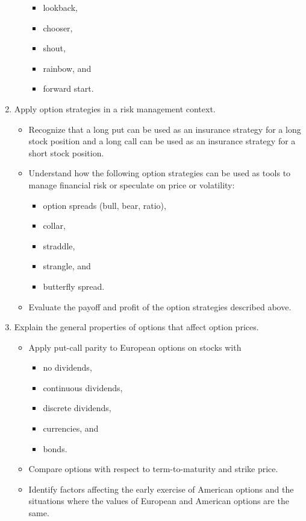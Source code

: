 \begin{outcomes}
\begin{enumerate}[label = \alph*)]
\begin{knowledge}[]
\begin{itemize}
			\begin{itemize}
			\item	lookback, 
			\item	chooser, 
			\item	shout, 
			\item	rainbow, and 
			\item	forward start.
			\end{itemize}
		\end{itemize}
		\end{knowledge}
	\item	Apply option strategies in a risk management context.
		\begin{knowledge}[]
		\begin{itemize}
		\item	Recognize that a long put can be used as an insurance strategy for a long stock position and a long call can be used as an insurance strategy for a short stock position.
		\item	Understand how the following option strategies can be used as tools to manage financial risk or speculate on price or volatility: 
			\begin{itemize}
			\item	option spreads (bull, bear, ratio), 
			\item	collar, 
			\item	straddle, 
			\item	strangle, and 
			\item	butterfly spread.
			\end{itemize}
		\item	Evaluate the payoff and profit of the option strategies described above.
		\end{itemize}
		\end{knowledge}
	\item	Explain the general properties of options that affect option prices.
		\begin{knowledge}[]
		\begin{itemize}
		\item	Apply put-call parity to European options on stocks with
			\begin{itemize}
			\item	no dividends, 
			\item	continuous dividends, 
			\item	discrete dividends,
			\item	currencies, and 
			\item	bonds.
			\end{itemize}			 
		\item	Compare options with respect to term-to-maturity and strike price.
		\item	Identify factors affecting the early exercise of American options and the situations where the values of European and American options are the same.
		\end{itemize}
		\end{knowledge}
	\end{enumerate}
\end{outcomes}

